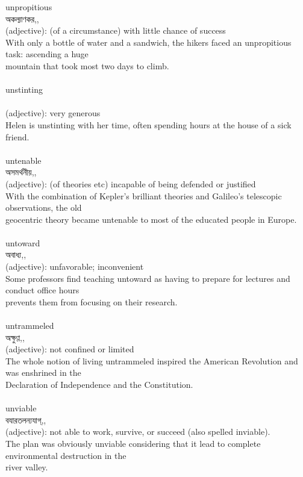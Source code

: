 \documentclass{article}
\begin{document}
{{unpropitious}\\
{অকল্যাণকর,,}\\
{(adjective): (of a circumstance) with little chance of success\\With only a bottle of water and a sandwich, the hikers faced an unpropitious task: ascending a huge\\mountain that took most two days to climb.\\}\\
{unstinting}\\
{}\\
{(adjective): very generous\\Helen is unstinting with her time, often spending hours at the house of a sick friend.\\}\\
{untenable}\\
{অসমর্থনীয়,,}\\
{(adjective): (of theories etc) incapable of being defended or justified\\With the combination of Kepler's brilliant theories and Galileo's telescopic observations, the old\\geocentric theory became untenable to most of the educated people in Europe.\\}\\
{untoward}\\
{অবাধ্য,,}\\
{(adjective): unfavorable; inconvenient\\Some professors find teaching untoward as having to prepare for lectures and conduct office hours\\prevents them from focusing on their research.\\}\\
{untrammeled}\\
{অক্ষুণ্ণ,,}\\
{(adjective): not confined or limited\\The whole notion of living untrammeled inspired the American Revolution and was enshrined in the\\Declaration of Independence and the Constitution.\\}\\
{unviable}\\
{বযারতলন্যযাগ্,,}\\
{(adjective): not able to work, survive, or succeed (also spelled inviable).\\The plan was obviously unviable considering that it lead to complete environmental destruction in the\\river valley.\\}\\
}
\end{document}
